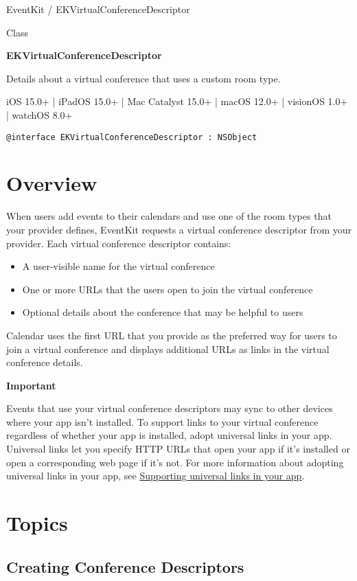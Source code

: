 \documentclass{article}
\title{}
\author{}
\date{}
\begin{document}
EventKit / EKVirtualConferenceDescriptor

Class

\textbf{EKVirtualConferenceDescriptor}

Details about a virtual conference that uses a custom room type.

iOS 15.0+ | iPadOS 15.0+ | Mac Catalyst 15.0+ | macOS 12.0+ | visionOS 1.0+ | watchOS 8.0+

\texttt{@interface EKVirtualConferenceDescriptor : NSObject}

\section*{Overview}

When users add events to their calendars and use one of the room types that your provider defines, EventKit requests a virtual conference descriptor from your provider. Each virtual conference descriptor contains:

\begin{itemize}
    \item A user-visible name for the virtual conference
    \item One or more URLs that the users open to join the virtual conference
    \item Optional details about the conference that may be helpful to users
\end{itemize}

Calendar uses the first URL that you provide as the preferred way for users to join a virtual conference and displays additional URLs as links in the virtual conference details.

\textbf{Important}

Events that use your virtual conference descriptors may sync to other devices where your app isn't installed. To support links to your virtual conference regardless of whether your app is installed, adopt universal links in your app. Universal links let you specify HTTP URLs that open your app if it's installed or open a corresponding web page if it's not. For more information about adopting universal links in your app, see \href{Supporting universal links in your app}{Supporting universal links in your app}.

\section*{Topics}

\subsection*{Creating Conference Descriptors}
\end{document}
